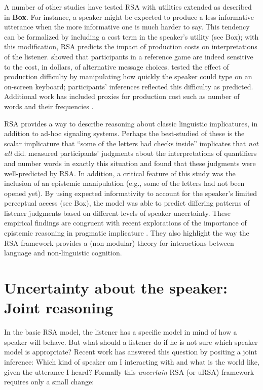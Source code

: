 \documentclass[]{elsarticle}
\begin{document}
A number of other studies have tested RSA with utilities extended as
described in \textbf{Box}. For instance, a speaker might be expected to
produce a less informative utterance when the more informative one is
much harder to say. This tendency can be formalized by including a cost
term in the speaker's utility (see Box); with this modification, RSA
predicts the impact of production costs on interpretations of the
listener. \citet{bergen2012} showed that participants in a reference
game are indeed sensitive to the cost, in dollars, of alternative
message choices. \cite{degen2013} tested the effect of production
difficulty by manipulating how quickly the speaker could type on an
on-screen keyboard; participants' inferences reflected this difficulty
as predicted. Additional work has included proxies for production cost
such as number of words and their frequencies \citep{nordmeyer2014,graf2016}.

RSA provides a way to describe reasoning about classic linguistic
implicatures, in addition to ad-hoc signaling systems. Perhaps the
best-studied of these is the scalar implicature that ``some of the
letters had checks inside'' implicates that \emph{not all} did. \citet{goodman2013} measured participants' judgments about the
interpretations of quantifiers and number words in exactly this
situation and found that these judgments were well-predicted by RSA. In
addition, a critical feature of this study was the inclusion of an
epistemic manipulation (e.g., some of the letters had not been opened
yet). By using expected informativity to account for the speaker's
limited perceptual access (see Box), the model was able to predict
differing patterns of listener judgments based on different levels of
speaker uncertainty. These empirical findings are congruent with recent
explorations of the importance of epistemic reasoning in pragmatic
implicature \citep[e.g.,]{bergen2012,breheny2013}. They
also highlight the way the RSA framework provides a (non-modular) theory
for interactions between language and non-linguistic cognition.

\section{Uncertainty about the speaker: Joint reasoning}\label{uncertainty-about-the-speaker-joint-reasoning}

In the basic RSA model, the listener has a specific model in mind of how
a speaker will behave. But what should a listener do if he is not sure
which speaker model is appropriate? Recent work has answered this
question by positing a joint inference: Which kind of speaker am I
interacting with and what is the world like, given the utterance I
heard? Formally this \emph{uncertain} RSA (or uRSA) framework requires
only a small change:
\end{document}
